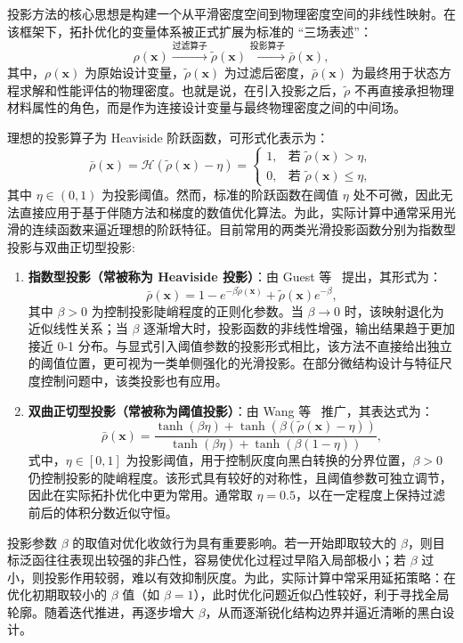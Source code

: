 投影方法的核心思想是构建一个从平滑密度空间到物理密度空间的非线性映射。在该框架下，拓扑优化的变量体系被正式扩展为标准的 “三场表述”：
\[
\rho(\boldsymbol{x}) \xrightarrow{\text{过滤算子}} \tilde{\rho}(\boldsymbol{x}) \xrightarrow{\text{投影算子}} \bar{\rho}(\boldsymbol{x}),
\]
其中，$\rho(\boldsymbol{x})$ 为原始设计变量，$\tilde{\rho}(\boldsymbol{x})$ 为过滤后密度，$\bar{\rho}(\boldsymbol{x})$ 为最终用于状态方程求解和性能评估的物理密度。也就是说，在引入投影之后，$\tilde{\rho}$ 不再直接承担物理材料属性的角色，而是作为连接设计变量与最终物理密度之间的中间场。

理想的投影算子为 Heaviside 阶跃函数，可形式化表示为：
\[
\bar{\rho}(\boldsymbol{x}) = \mathcal{H}(\tilde{\rho}(\boldsymbol{x}) - \eta) = 
\begin{cases}
	1, & \text{若 } \tilde{\rho}(\boldsymbol{x}) > \eta, \\
	0, & \text{若 } \tilde{\rho}(\boldsymbol{x}) \leq \eta,
\end{cases}
\]
其中 $\eta \in (0,1)$ 为投影阈值。然而，标准的阶跃函数在阈值 $\eta$ 处不可微，因此无法直接应用于基于伴随方法和梯度的数值优化算法。为此，实际计算中通常采用光滑的连续函数来逼近理想的阶跃特征。目前常用的两类光滑投影函数分别为指数型投影与双曲正切型投影:
\begin{enumerate}
	\item \textbf{指数型投影（常被称为 Heaviside 投影）}：由 Guest 等~\cite{guestAchievingMinimumLength2004b} 提出，其形式为：
	\begin{equation} \label{eq:ch2_exponential_projection}
		\bar{\rho}(\boldsymbol{x}) = 1 - e^{-\beta \tilde{\rho}(\boldsymbol{x})} + \tilde{\rho}(\boldsymbol{x}) e^{-\beta},
	\end{equation}
	其中 $\beta > 0$ 为控制投影陡峭程度的正则化参数。当 $\beta \to 0$ 时，该映射退化为近似线性关系；当 $\beta$ 逐渐增大时，投影函数的非线性增强，输出结果趋于更加接近 0-1 分布。与显式引入阈值参数的投影形式相比，该方法不直接给出独立的阈值位置，更可视为一类单侧强化的光滑投影。在部分微结构设计与特征尺度控制问题中，该类投影也有应用。

	\item \textbf{双曲正切型投影（常被称为阈值投影）}：由 Wang 等~\cite{wangProjectionMethodsConvergence2011a} 推广，其表达式为：
	\begin{equation} \label{eq:ch2_tanh_projection}
		\bar{\rho}(\boldsymbol{x}) = \frac{\tanh(\beta \eta) + \tanh(\beta (\tilde{\rho}(\boldsymbol{x}) - \eta))}{\tanh(\beta \eta) + \tanh(\beta (1 - \eta))},
	\end{equation}
	式中，$\eta \in [0,1]$ 为投影阈值，用于控制灰度向黑白转换的分界位置，$\beta>0$ 仍控制投影的陡峭程度。该形式具有较好的对称性，且阈值参数可独立调节，因此在实际拓扑优化中更为常用。通常取 $\eta=0.5$，以在一定程度上保持过滤前后的体积分数近似守恒。
\end{enumerate}
投影参数 $\beta$ 的取值对优化收敛行为具有重要影响。若一开始即取较大的 $\beta$，则目标泛函往往表现出较强的非凸性，容易使优化过程过早陷入局部极小；若 $\beta$ 过小，则投影作用较弱，难以有效抑制灰度。为此，实际计算中常采用延拓策略：在优化初期取较小的 $\beta$ 值（如 $\beta=1$），此时优化问题近似凸性较好，利于寻找全局轮廓。随着迭代推进，再逐步增大 $\beta$，从而逐渐锐化结构边界并逼近清晰的黑白设计。


